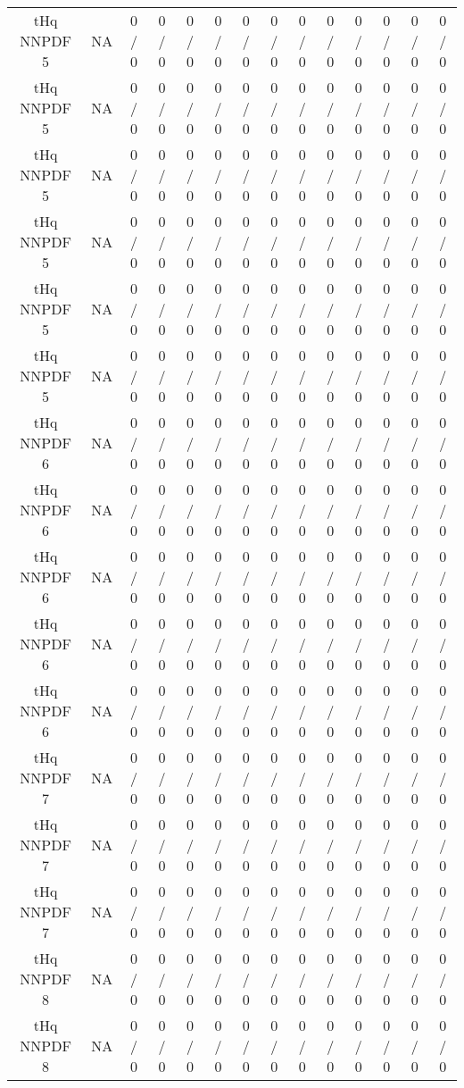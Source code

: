 \documentclass[10pt]{article}
\begin{document}
\begin{table}[htbp]
\begin{center}
\begin{tabular}{|c|c|c|c|c|c|c|c|c|c|c|c|c|c|}
  tHq NNPDF 5 &    NA    & 0 / 0 & 0 / 0 & 0 / 0 & 0 / 0 & 0 / 0 & 0 / 0 & 0 / 0 & 0 / 0 & 0 / 0 & 0 / 0 & 0 / 0 & 0 / 0 \\ 
  tHq NNPDF 5 &    NA    & 0 / 0 & 0 / 0 & 0 / 0 & 0 / 0 & 0 / 0 & 0 / 0 & 0 / 0 & 0 / 0 & 0 / 0 & 0 / 0 & 0 / 0 & 0 / 0 \\ 
  tHq NNPDF 5 &    NA    & 0 / 0 & 0 / 0 & 0 / 0 & 0 / 0 & 0 / 0 & 0 / 0 & 0 / 0 & 0 / 0 & 0 / 0 & 0 / 0 & 0 / 0 & 0 / 0 \\ 
  tHq NNPDF 5 &    NA    & 0 / 0 & 0 / 0 & 0 / 0 & 0 / 0 & 0 / 0 & 0 / 0 & 0 / 0 & 0 / 0 & 0 / 0 & 0 / 0 & 0 / 0 & 0 / 0 \\ 
  tHq NNPDF 5 &    NA    & 0 / 0 & 0 / 0 & 0 / 0 & 0 / 0 & 0 / 0 & 0 / 0 & 0 / 0 & 0 / 0 & 0 / 0 & 0 / 0 & 0 / 0 & 0 / 0 \\ 
  tHq NNPDF 5 &    NA    & 0 / 0 & 0 / 0 & 0 / 0 & 0 / 0 & 0 / 0 & 0 / 0 & 0 / 0 & 0 / 0 & 0 / 0 & 0 / 0 & 0 / 0 & 0 / 0 \\ 
  tHq NNPDF 6 &    NA    & 0 / 0 & 0 / 0 & 0 / 0 & 0 / 0 & 0 / 0 & 0 / 0 & 0 / 0 & 0 / 0 & 0 / 0 & 0 / 0 & 0 / 0 & 0 / 0 \\ 
  tHq NNPDF 6 &    NA    & 0 / 0 & 0 / 0 & 0 / 0 & 0 / 0 & 0 / 0 & 0 / 0 & 0 / 0 & 0 / 0 & 0 / 0 & 0 / 0 & 0 / 0 & 0 / 0 \\ 
  tHq NNPDF 6 &    NA    & 0 / 0 & 0 / 0 & 0 / 0 & 0 / 0 & 0 / 0 & 0 / 0 & 0 / 0 & 0 / 0 & 0 / 0 & 0 / 0 & 0 / 0 & 0 / 0 \\ 
  tHq NNPDF 6 &    NA    & 0 / 0 & 0 / 0 & 0 / 0 & 0 / 0 & 0 / 0 & 0 / 0 & 0 / 0 & 0 / 0 & 0 / 0 & 0 / 0 & 0 / 0 & 0 / 0 \\ 
  tHq NNPDF 6 &    NA    & 0 / 0 & 0 / 0 & 0 / 0 & 0 / 0 & 0 / 0 & 0 / 0 & 0 / 0 & 0 / 0 & 0 / 0 & 0 / 0 & 0 / 0 & 0 / 0 \\ 
  tHq NNPDF 7 &    NA    & 0 / 0 & 0 / 0 & 0 / 0 & 0 / 0 & 0 / 0 & 0 / 0 & 0 / 0 & 0 / 0 & 0 / 0 & 0 / 0 & 0 / 0 & 0 / 0 \\ 
  tHq NNPDF 7 &    NA    & 0 / 0 & 0 / 0 & 0 / 0 & 0 / 0 & 0 / 0 & 0 / 0 & 0 / 0 & 0 / 0 & 0 / 0 & 0 / 0 & 0 / 0 & 0 / 0 \\ 
  tHq NNPDF 7 &    NA    & 0 / 0 & 0 / 0 & 0 / 0 & 0 / 0 & 0 / 0 & 0 / 0 & 0 / 0 & 0 / 0 & 0 / 0 & 0 / 0 & 0 / 0 & 0 / 0 \\ 
  tHq NNPDF 8 &    NA    & 0 / 0 & 0 / 0 & 0 / 0 & 0 / 0 & 0 / 0 & 0 / 0 & 0 / 0 & 0 / 0 & 0 / 0 & 0 / 0 & 0 / 0 & 0 / 0 \\ 
  tHq NNPDF 8 &    NA    & 0 / 0 & 0 / 0 & 0 / 0 & 0 / 0 & 0 / 0 & 0 / 0 & 0 / 0 & 0 / 0 & 0 / 0 & 0 / 0 & 0 / 0 & 0 / 0 \\ 

\end{tabular}
\end{center}
\end{table}
\end{document}
